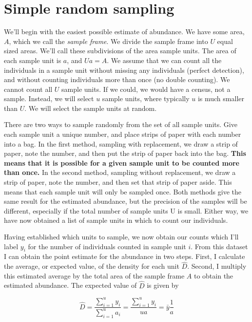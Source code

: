 \documentclass[]{book}
\theoremstyle{definition}
\theoremstyle{definition}
\theoremstyle{definition}
\theoremstyle{remark}
\begin{document}
\hypertarget{simple-random-sampling}{%
\section{Simple random sampling}\label{simple-random-sampling}}

We'll begin with the easiest possible estimate of abundance. We have
some area, \(A\), which we call the \emph{sample frame}. We divide the
sample frame into \(U\) equal sized areas. We'll call these subdivisions
of the area sample units. The area of each sample unit is \(a\), and
\(Ua=A\). We assume that we can count all the individuals in a sample
unit without missing any individuals (perfect detection), and without
counting individuals more than once (no double counting). We cannot
count all \(U\) sample units. If we could, we would have a census, not a
sample. Instead, we will select \(u\) sample units, where typically
\(u\) is much smaller than \(U\). We will select the sample units at
random.

There are two ways to sample randomly from the set of all sample units.
Give each sample unit a unique number, and place strips of paper with
each number into a bag. In the first method, sampling with replacement,
we draw a strip of paper, note the number, and then put the strip of
paper back into the bag. \textbf{This means that it is possible for a
given sample unit to be counted more than once.} In the second method,
sampling without replacement, we draw a strip of paper, note the number,
and then set that strip of paper aside. This means that each sample unit
will only be sampled once. Both methods give the same result for the
estimated abundance, but the precision of the samples will be different,
especially if the total number of sample units U is small. Either way,
we have now obtained a list of sample units in which to count our
individuals.

Having established which units to sample, we now obtain our counts which
I'll label \(y_i\) for the number of individuals counted in sample unit
\(i\). From this dataset I can obtain the point estimate for the
abundance in two steps. First, I calculate the average, or expected
value, of the density for each unit \(\hat{D}\). Second, I multiply this
estimated average by the total area of the sample frame \(A\) to obtain
the estimated abundance. The expected value of \(\hat{D}\) is given by

\begin{equation}
  \hat{D}=\frac{\sum_{i=1}^u{y_i}}{\sum_{i=1}^u{a_i}}
         =\frac{\sum_{i=1}^u{y_i}}{ua}
         =\bar{y}\frac{1}{a}
  \label{eq:densitySWR}
\end{equation}
\end{document}
